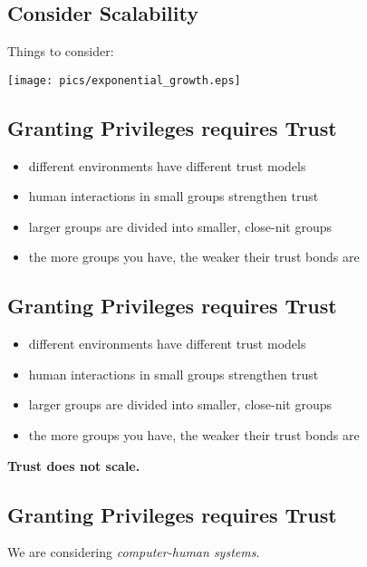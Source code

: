 \documentclass[xga]{xdvislides}
\begin{document}
\subsection{Consider Scalability}
Things to consider:
\\

\begin{center}
	\texttt{[image: pics/exponential\_growth.eps]}
\end{center}


\subsection{Granting Privileges requires Trust}
\begin{itemize}
	\item different environments have different trust models
	\item human interactions in small groups strengthen trust
	\item larger groups are divided into smaller, close-nit groups
	\item the more groups you have, the weaker their trust bonds are
\end{itemize}

\subsection{Granting Privileges requires Trust}
\begin{itemize}
	\item different environments have different trust models
	\item human interactions in small groups strengthen trust
	\item larger groups are divided into smaller, close-nit groups
	\item the more groups you have, the weaker their trust bonds are
\end{itemize}
\vspace{.5in}

\begin{center}
	\Huge
	{\bf Trust does not scale.}
	\Normalsize
\end{center}

\subsection{Granting Privileges requires Trust}
\Huge
We are considering {\em computer-human systems}. \\
\end{document}
